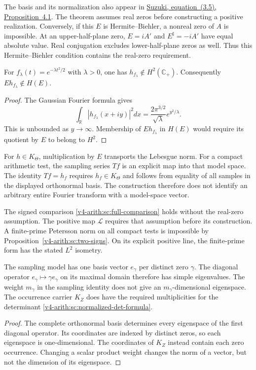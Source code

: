 The basis and its normalization also appear in
\href{https://arxiv.org/html/2301.00421v3}{Suzuki, equation~(3.5), Proposition~4.1}.
The theorem assumes real zeros before constructing a positive realization.
Conversely, if this $E$ is Hermite--Biehler, a nonreal zero of $A$ is impossible.
At an upper-half-plane zero, $E=iA'$ and $E^\sharp=-iA'$ have equal absolute value.
Real conjugation excludes lower-half-plane zeros as well.
Thus this Hermite--Biehler condition contains the real-zero requirement.

\begin{proposition}
\label{v4-arith:db:prop:hardy}
For $f_\lambda(t)=e^{-\lambda t^2/2}$ with $\lambda>0$, one has
$h_{f_\lambda}\notin H^2(\mathbb C_+)$.
Consequently $E h_{f_\lambda}\notin H(E)$.
\end{proposition}
\begin{proof}
The Gaussian Fourier formula gives
\[
 \int_{\mathbb R}|h_{f_\lambda}(x+iy)|^2dx
 =\frac{2\pi^{3/2}}{\sqrt\lambda}e^{y^2/\lambda}.
\]
This is unbounded as $y\to\infty$.
Membership of $E h_{f_\lambda}$ in $H(E)$ would require its quotient
by $E$ to belong to $H^2$.
\end{proof}

For $h\in K_\Theta$, multiplication by $E$ transports the Lebesgue
norm. For a compact arithmetic test, the sampling series $Tf$ is
an explicit map into that model space. The identity
$Tf=h_f$ requires $h_f\in K_\Theta$ and follows from equality of
all samples in the displayed orthonormal basis.
The construction therefore does not identify an arbitrary entire
Fourier transform with a model-space vector.

The signed comparison \eqref{v4-arith:sc:full-comparison} holds
without the real-zero assumption. The positive map $\mathcal L$
requires that assumption before its construction.
A finite-prime Petersson norm on all compact tests is impossible by
Proposition~\ref{v4-arith:sc:two-signs}. On its explicit positive line, the
finite-prime form has the stated $L^2$ isometry.

\begin{proposition}
The sampling model has one basis vector $e_\gamma$ per distinct
zero $\gamma$. The diagonal operator $e_\gamma\mapsto\gamma e_\gamma$
on its maximal domain therefore has simple eigenvalues.
The weight $m_\gamma$ in the sampling identity does not give an
$m_\gamma$-dimensional eigenspace.
The occurrence carrier $K_Z$ does have the required multiplicities
for the determinant \eqref{v4-arith:sc:normalized-det-formula}.
\end{proposition}
\begin{proof}
The complete orthonormal basis determines every eigenspace of the
first diagonal operator. Its coordinates are indexed by distinct
zeros, so each eigenspace is one-dimensional.
The coordinates of $K_Z$ instead contain each zero occurrence.
Changing a scalar product weight changes the norm of a vector,
but not the dimension of its eigenspace.
\end{proof}
